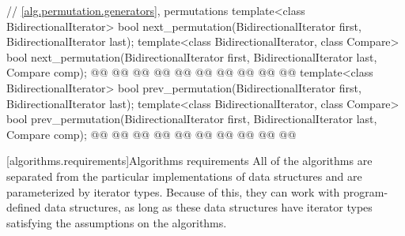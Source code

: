 \begin{codeblock}
{  // \ref{alg.permutation.generators}, permutations
  template<class BidirectionalIterator>
    bool next_permutation(BidirectionalIterator first,
                          BidirectionalIterator last);
  template<class BidirectionalIterator, class Compare>
    bool next_permutation(BidirectionalIterator first,
                          BidirectionalIterator last, Compare comp);
  @@
    @@
        @@
      @@
      @@
    @@
        @@
      @@
      @@
  @\added{\}}@
  template<class BidirectionalIterator>
    bool prev_permutation(BidirectionalIterator first,
                          BidirectionalIterator last);
  template<class BidirectionalIterator, class Compare>
    bool prev_permutation(BidirectionalIterator first,
                          BidirectionalIterator last, Compare comp);
  @@
    @@
        @@
      @@
      @@
    @@
        @@
      @@
      @@
  @\added{\}}@
}
\end{codeblock}

[algorithms.requirements]{Algorithms requirements}
\pnum
All of the algorithms are separated from the particular implementations of data structures and are
parameterized by iterator types.
Because of this, they can work with program-defined data structures, as long
as these data structures have iterator types satisfying the assumptions on the algorithms.

